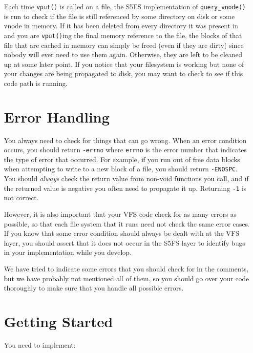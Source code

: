 Each time \texttt{vput()} is called on a file, the S5FS implementation of \texttt{query\_vnode()} is run to check if the file is still referenced by some directory on disk or some vnode in memory. If it has been deleted from every directory it was present in and you are \texttt{vput()}ing the final memory reference to the file, the blocks of that file that are cached in memory can simply be freed (even if they are dirty) since nobody will ever need to use them again. Otherwise, they are left to be cleaned up at some later point. If you notice that your filesystem is working but none of your changes are being propagated to disk, you may want to check to see if this code path is running.

\section{Error Handling}

You always need to check for things that can go wrong. When an error condition occurs, you should return \texttt{-errno} where \texttt{errno} is the error number that indicates the type of error that occurred. For example, if you run out of free data blocks when attempting to write to a new block of a file, you should return \texttt{-ENOSPC}. You should \emph{always} check the return value from non-void functions you call, and if the returned value is negative you often need to propagate it up. Returning \texttt{-1} is not correct.

However, it is also important that your VFS code check for as many errors as possible, so that each file system that it runs need not check the same error cases. If you know that some error condition should always be dealt with at the VFS layer, you should assert that it does not occur in the S5FS layer to identify bugs in your implementation while you develop.

We have tried to indicate some errors that you should check for in the comments, but we have probably not mentioned all of them, so you should go over your code thoroughly to make sure that you handle all possible errors.

\section{Getting Started}

You need to implement:

